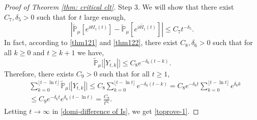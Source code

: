 \documentclass[12pt,a4paper]{amsart}
\theoremstyle{plain}
\theoremstyle{definition}
\numberwithin{equation}{section}
\begin{document}
\begin{proof}[Proof of Theorem \ref{thm: critical clt}]
    Step 3.
    We will show that there exist $C_7, \delta_5> 0$ such that for $t$ large enough,
\begin{equation}\label{domi-difference of Is}
    |\mathbb{\widetilde{P}}_{\mu}[e^{i\theta I_1(t)}] - \mathbb{\widetilde{P}}_{\mu}[e^{i\theta\widetilde{I}_1(t)}]|
    \leq C_7 t^{-\delta_5}.
\end{equation}
    In fact, according to \eqref{thm121} and \eqref{thm122}, there exist $C_8,\delta_6 > 0$ such that
    for all $k \geq 0$ and $t\geq k+1$ we have,
\[
    \widetilde{\mathbb P}_\mu\big[|Y_{t,k}|\big]
    \leq C_8 e^{-\delta_6(t-k)}.
\]
   Therefore, there exists $C_9> 0$  such that for all $t \geq 1$,
\begin{align}
    &\sum_{k=0}^{\lfloor t-\ln t \rfloor} \widetilde {\mathbb P}_\mu\big[|Y_{t,k}|\big]
    \leq C_8\sum_{k=0}^{\lfloor t-\ln t \rfloor} e^{-\delta_6(t-k)}
    = C_8 e^{-\delta_6 t}\sum_{k=0}^{\lfloor t-\ln t \rfloor} e^{\delta_6 k}
    \\&\leq C_9 e^{-\delta_6 t}e^{\delta_6 (t-\ln t)}
    = \frac{C_9}{t^{\delta_6}}.
\end{align}
    Letting $t\to\infty$ in \eqref{domi-difference of Is}, we get \eqref{toprove-1}.


\end{proof}
\end{document}
